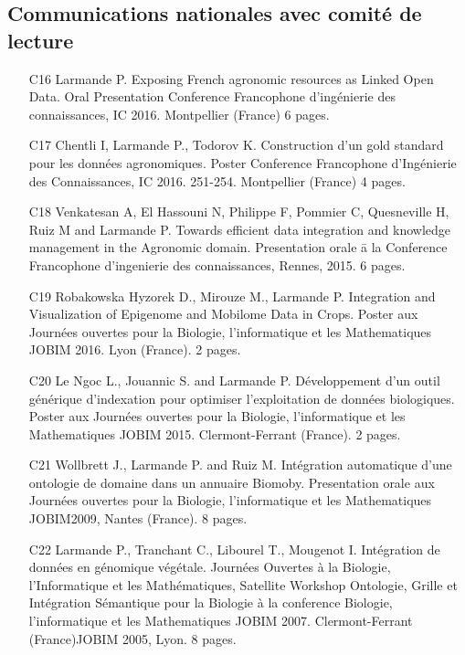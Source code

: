 \subsection*{Communications nationales avec comité de lecture }
\begin{itemize} 
\item [C16]	Larmande P. Exposing French agronomic resources as Linked Open Data. Oral Presentation Conference Francophone d’ingénierie des connaissances, IC 2016. Montpellier (France) 6 pages.
\item [C17]	Chentli I, Larmande P., Todorov K. Construction d’un gold standard pour les données agronomiques. Poster Conference Francophone d’Ingénierie des Connaissances, IC 2016. 251-254. Montpellier (France) 4 pages.
\item [C18]	Venkatesan A, El Hassouni N, Philippe F, Pommier C, Quesneville H, Ruiz M and Larmande P. Towards efficient data integration and knowledge management in the Agronomic domain. Presentation orale ā la Conference Francophone d’ingenierie des connaissances, Rennes, 2015. 6 pages.
\item [C19]	Robakowska Hyzorek D., Mirouze M., Larmande P. Integration and Visualization of Epigenome and Mobilome Data in Crops. Poster aux Journées ouvertes pour la Biologie, l’informatique et les Mathematiques JOBIM 2016. Lyon (France). 2 pages.
\item [C20]	Le Ngoc L., Jouannic S. and Larmande P. Développement d'un outil générique d'indexation pour optimiser l'exploitation de données biologiques. Poster aux Journées ouvertes pour la Biologie, l’informatique et les Mathematiques JOBIM 2015. Clermont-Ferrant (France). 2 pages.
\item [C21]	Wollbrett J., Larmande P. and Ruiz M. Intégration automatique d’une ontologie de domaine dans un annuaire Biomoby. Presentation orale aux Journées ouvertes pour la Biologie, l’informatique et les Mathematiques JOBIM2009, Nantes (France). 8 pages.
\item [C22]	Larmande P., Tranchant C., Libourel T., Mougenot I. Intégration de données en génomique végétale. Journées Ouvertes à la Biologie, l’Informatique et les Mathématiques, Satellite Workshop Ontologie, Grille et Intégration Sémantique pour la Biologie à la conference Biologie, l’informatique et les Mathematiques JOBIM 2007. Clermont-Ferrant (France)JOBIM 2005, Lyon. 8 pages.
\end{itemize} 




